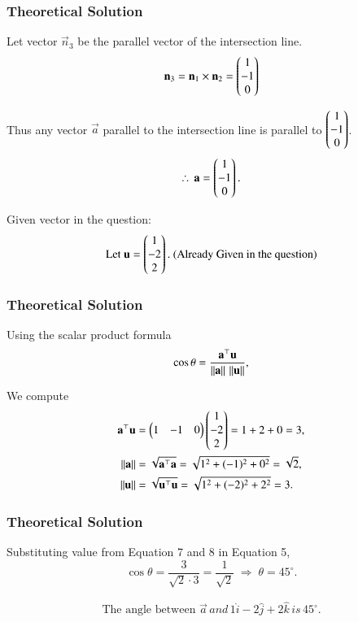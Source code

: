 \documentclass{beamer}
\begin{document}
\begin{frame}[fragile]
\frametitle{Theoretical Solution}
Let vector $\vec{n}_3$ be the parallel vector of the intersection line.
\begin{equation}
    \mathbf{n}_3 = \mathbf{n}_1 \times \mathbf{n}_2 = \begin{pmatrix}1 \\ -1 \\ 0\end{pmatrix}
\end{equation}


 Thus any vector $\vec{a}$ parallel to the intersection line is parallel to $\begin{pmatrix}1 \\ -1 \\ 0\end{pmatrix}$.
\begin{equation}
\therefore \, \mathbf{a} = \begin{pmatrix}1 \\ -1 \\ 0\end{pmatrix}.
\end{equation}

Given vector in the question:
\begin{equation}
\text{Let }
\mathbf{u} = \begin{pmatrix}1 \\ -2 \\ 2\end{pmatrix}. \text{ (Already Given in the question)}
\end{equation}
\end{frame}

\begin{frame}[fragile]
\frametitle{Theoretical Solution}
Using the scalar product formula
\begin{equation}
\cos \theta = \frac{\mathbf{a}^{\top}\mathbf{u}}{ \left\lVert\mathbf{a}\right\rVert \,  \left\lVert\mathbf{u}\right\rVert},
\end{equation}

We compute
\begin{align}
\mathbf{a}^{\top}\mathbf{u} &= \begin{pmatrix}1 & -1 & 0\end{pmatrix}\begin{pmatrix}1 \\ -2 \\ 2\end{pmatrix} = 1 + 2 + 0 = 3, \\
 \left\lVert\mathbf{a}\right\rVert &= \sqrt{\mathbf{a}^{\top}\mathbf{a}} = \sqrt{1^{2}+(-1)^{2}+0^{2}} = \sqrt{2}, \\
 \left\lVert\mathbf{u}\right\rVert &= \sqrt{\mathbf{u}^{\top}\mathbf{u}}=\sqrt{1^{2}+(-2)^{2}+2^{2}} = 3.
\end{align}
\end{frame}

\begin{frame}[fragile]
\frametitle{Theoretical Solution}
Substituting value from Equation 7 and 8 in Equation 5,
\begin{equation}
\cos \theta = \frac{3}{\sqrt{2}\cdot 3} = \frac{1}{\sqrt{2}}
\;\Rightarrow\;
\theta = 45^{\circ}.
\end{equation}

\begin{align}
  \boxed{\text{The angle between } \vec{a} \, and \, 1\hat{i} -2\hat{j}+2\hat{k} \, is \, 45^{\circ}.}  
\end{align}
\end{frame}
\end{document}

